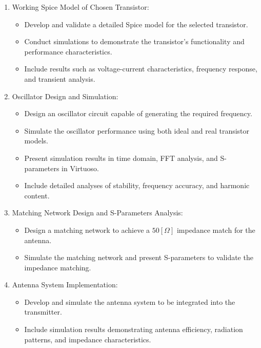 \documentclass[]{extarticle}
\begin{document}
\begin{enumerate}
    \item {Working Spice Model of Chosen Transistor:}
    \begin{itemize}
        \item Develop and validate a detailed Spice model for the selected transistor.
        \item Conduct simulations to demonstrate the transistor's functionality and performance characteristics.
        \item Include results such as voltage-current characteristics, frequency response, and transient analysis.
    \end{itemize}

    \item {Oscillator Design and Simulation:}
    \begin{itemize}
        \item Design an oscillator circuit capable of generating the required frequency.
        \item Simulate the oscillator performance using both ideal and real transistor models.
        \item Present simulation results in time domain, FFT analysis, and S-parameters in Virtuoso.
        \item Include detailed analyses of stability, frequency accuracy, and harmonic content.
    \end{itemize}

    \item {Matching Network Design and S-Parameters Analysis:}
    \begin{itemize}
        \item Design a matching network to achieve a \(50[\Omega]\) impedance match for the antenna.
        \item Simulate the matching network and present S-parameters to validate the impedance matching.
    \end{itemize}

    \item {Antenna System Implementation:}
    \begin{itemize}
        \item Develop and simulate the antenna system to be integrated into the transmitter.
        \item Include simulation results demonstrating antenna efficiency, radiation patterns, and impedance characteristics.
    \end{itemize}


\end{enumerate}
\end{document}

